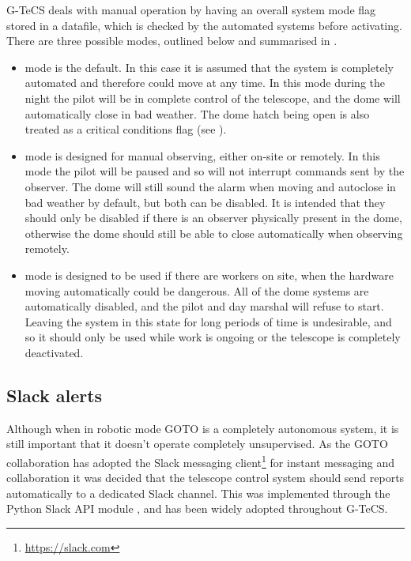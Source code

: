 \begin{colsection}
\begin{colsection}
G-TeCS deals with manual operation by having an overall system mode flag stored in a datafile, which is checked by the automated systems before activating. There are three possible modes, outlined below and summarised in .

\begin{itemize}
    \item {} mode is the default. In this case it is assumed that the system is completely automated and therefore could move at any time. In this mode during the night the pilot will be in complete control of the telescope, and the dome will automatically close in bad weather. The dome hatch being open is also treated as a critical conditions flag (see ).

    \item {} mode is designed for manual observing, either on-site or remotely. In this mode the pilot will be paused and so will not interrupt commands sent by the observer. The dome will still sound the alarm when moving and autoclose in bad weather by default, but both can be disabled. It is intended that they should only be disabled if there is an observer physically present in the dome, otherwise the dome should still be able to close automatically when observing remotely.

    \item {} mode is designed to be used if there are workers on site, when the hardware moving automatically could be dangerous. All of the dome systems are automatically disabled, and the pilot and day marshal will refuse to start. Leaving the system in this state for long periods of time is undesirable, and so it should only be used while work is ongoing or the telescope is completely deactivated.
\end{itemize}

\end{colsection}

\subsection{Slack alerts}
\label{sec:slack}
\begin{colsection}

Although when in robotic mode GOTO is a completely autonomous system, it is still important that it doesn't operate completely unsupervised. As the GOTO collaboration has adopted the Slack messaging client\footnote{\url{https://slack.com}} for instant messaging and collaboration it was decided that the telescope control system should send reports automatically to a dedicated Slack channel. This was implemented through the Python Slack API module , and has been widely adopted throughout G-TeCS.\@


\end{colsection}
\end{colsection}
